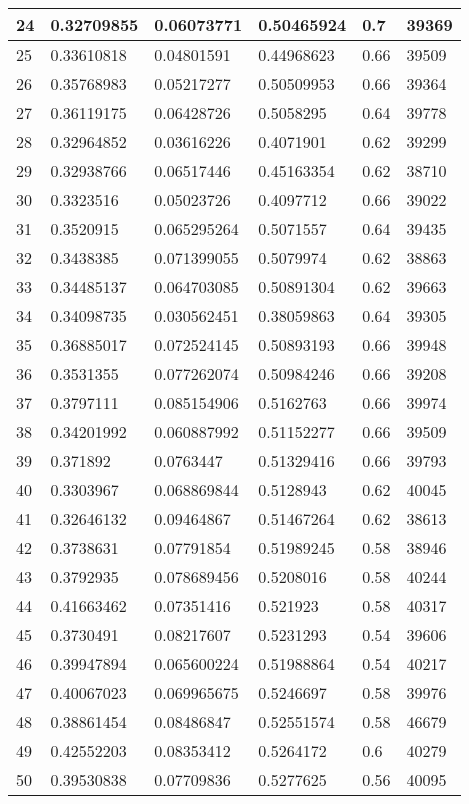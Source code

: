 \begin{longtable}{|l|l|l|l|l|l|}
24 & 0.32709855 & 0.06073771 & 0.50465924 & 0.7 & 39369 \\ \hline 
25 & 0.33610818 & 0.04801591 & 0.44968623 & 0.66 & 39509 \\ \hline 
26 & 0.35768983 & 0.05217277 & 0.50509953 & 0.66 & 39364 \\ \hline 
27 & 0.36119175 & 0.06428726 & 0.5058295 & 0.64 & 39778 \\ \hline 
28 & 0.32964852 & 0.03616226 & 0.4071901 & 0.62 & 39299 \\ \hline 
29 & 0.32938766 & 0.06517446 & 0.45163354 & 0.62 & 38710 \\ \hline 
30 & 0.3323516 & 0.05023726 & 0.4097712 & 0.66 & 39022 \\ \hline 
31 & 0.3520915 & 0.065295264 & 0.5071557 & 0.64 & 39435 \\ \hline 
32 & 0.3438385 & 0.071399055 & 0.5079974 & 0.62 & 38863 \\ \hline 
33 & 0.34485137 & 0.064703085 & 0.50891304 & 0.62 & 39663 \\ \hline 
34 & 0.34098735 & 0.030562451 & 0.38059863 & 0.64 & 39305 \\ \hline 
35 & 0.36885017 & 0.072524145 & 0.50893193 & 0.66 & 39948 \\ \hline 
36 & 0.3531355 & 0.077262074 & 0.50984246 & 0.66 & 39208 \\ \hline 
37 & 0.3797111 & 0.085154906 & 0.5162763 & 0.66 & 39974 \\ \hline 
38 & 0.34201992 & 0.060887992 & 0.51152277 & 0.66 & 39509 \\ \hline 
39 & 0.371892 & 0.0763447 & 0.51329416 & 0.66 & 39793 \\ \hline 
40 & 0.3303967 & 0.068869844 & 0.5128943 & 0.62 & 40045 \\ \hline 
41 & 0.32646132 & 0.09464867 & 0.51467264 & 0.62 & 38613 \\ \hline 
42 & 0.3738631 & 0.07791854 & 0.51989245 & 0.58 & 38946 \\ \hline 
43 & 0.3792935 & 0.078689456 & 0.5208016 & 0.58 & 40244 \\ \hline 
44 & 0.41663462 & 0.07351416 & 0.521923 & 0.58 & 40317 \\ \hline 
45 & 0.3730491 & 0.08217607 & 0.5231293 & 0.54 & 39606 \\ \hline 
46 & 0.39947894 & 0.065600224 & 0.51988864 & 0.54 & 40217 \\ \hline 
47 & 0.40067023 & 0.069965675 & 0.5246697 & 0.58 & 39976 \\ \hline 
48 & 0.38861454 & 0.08486847 & 0.52551574 & 0.58 & 46679 \\ \hline 
49 & 0.42552203 & 0.08353412 & 0.5264172 & 0.6 & 40279 \\ \hline 
50 & 0.39530838 & 0.07709836 & 0.5277625 & 0.56 & 40095 \\ \hline 
\end{longtable}